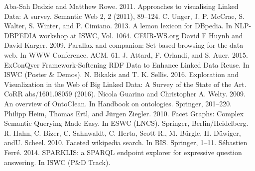 \documentclass{sig-alternate}
\begin{document}
\begin{thebibliography}{4}

 Aba-Sah Dadzie and Matthew Rowe. 2011. Approaches to visualising Linked Data: A survey. Semantic Web 2, 2 (2011), 89--124.
 C. Unger, J. P. McCrae, S. Walter, S. Winter, and P. Cimiano. 2013. A lemon lexicon for DBpedia. In NLP-DBPEDIA workshop at ISWC, Vol. 1064. CEUR-WS.org
 David F Huynh and David Karger. 2009. Parallax and companion: Set-based browsing for the data web. In WWW Conference. ACM. 61.
 J. Attard, F. Orlandi, and S. Auer. 2015. ExConQyer Framework-Softening RDF Data to Enhance Linked Data Reuse. In ISWC (Poster \& Demos).
 N. Bikakis and T. K. Sellis. 2016. Exploration and Visualization in the Web of Big Linked Data: A Survey of the State of the Art. CoRR abs/1601.08059 (2016).
 Nicola Guarino and Christopher A. Welty. 2009. An overview of OntoClean. In Handbook on ontologies. Springer, 201--220.
 Philipp Heim, Thomas Ertl, and Jürgen Ziegler. 2010. Facet Graphs: Complex Semantic Querying Made Easy. In ESWC (LNCS). Springer, Berlin/Heidelberg.
 R. Hahn, C. Bizer, C. Sahnwaldt, C. Herta, Scott R., M. Bürgle, H. Düwiger, andU. Scheel. 2010. Faceted wikipedia search. In BIS. Springer, 1--11.
 S\'ebastien Ferr\'e. 2014. SPARKLIS: a SPARQL endpoint explorer for expressive question answering. In ISWC (P\&D Track).

\end{thebibliography}
\end{document}
